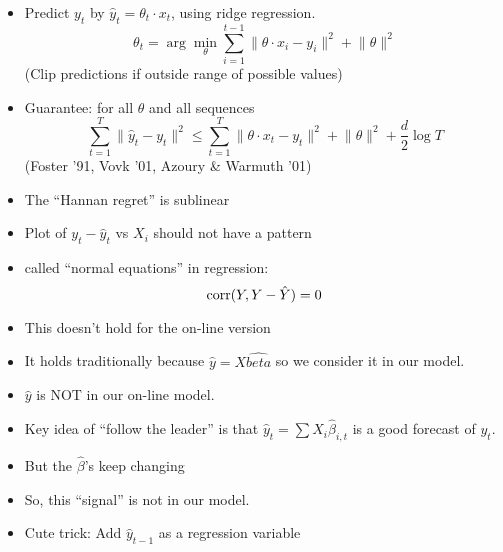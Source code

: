 \documentclass[landscape]{slides}
\begin{document}

\begin{itemize}
\item Predict $y_t$ by $\hat{y}_t = \theta_t \cdot x_t$, using ridge
regression.
\begin{displaymath}
\theta_t = \arg\min_\theta\sum_{i=1}^{t-1}\lVert\theta\cdot x_i-y_i\rVert^2 + \lVert\theta\rVert^2
\end{displaymath}
(Clip predictions if outside range of possible values)
\item Guarantee: for all $\theta$ and all sequences
\begin{displaymath}
\sum_{t=1}^T\lVert\hat{y}_t - y_t\rVert^2 \le \sum_{t=1}^T\lVert\theta\cdot x_t -
y_t\rVert^2 + \lVert \theta \rVert^2 + \frac{d}{2} \log T
\end{displaymath}
(Foster '91, Vovk '01, Azoury \& Warmuth '01)
\item  The ``Hannan regret'' is sublinear
\end{itemize}


\begin{itemize}
\item Plot of $y_t - \hat{y}_t$ vs $X_i$ should not have a pattern
\item called ``normal equations'' in regression:
\begin{displaymath}
\hbox{corr}(Y,Y-\hat{Y}) = 0
\end{displaymath}
\item This doesn't hold for the on-line version
\item It holds traditionally because $\hat{y} = X\hat{beta}$ so we
consider it in our model.
\item $\hat{y}$ is NOT in our on-line model.
\end{itemize}



\begin{itemize}
\item Key idea of ``follow the leader'' is that $\hat{y}_t = \sum X_i
\hat{\beta}_{i,t}$ is a good forecast of $y_t$.
\item But the $\hat{\beta}$'s keep changing
\item So, this ``signal'' is not in our model.
\item Cute trick: Add $\hat{y}_{t-1}$ as a regression variable
\end{itemize}
\end{document}
